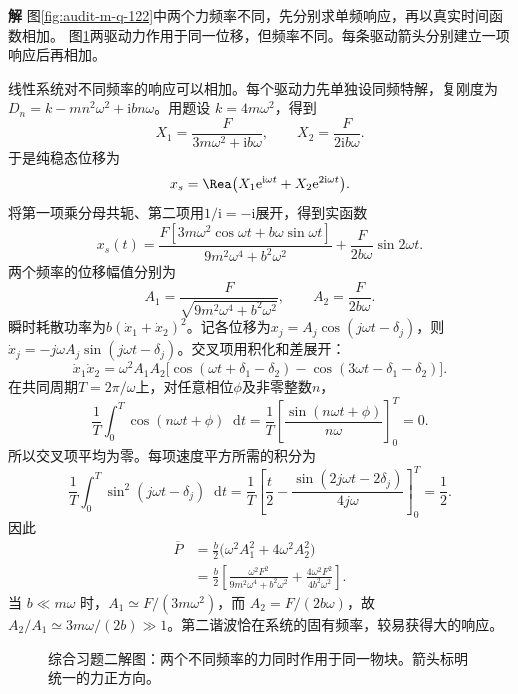 \documentclass[11pt,openany,fontset=fandol]{ctexbook}
\theoremstyle{plain}\newtheorem{theorem}{定理}[chapter]\newtheorem{proposition}[theorem]{命题}
\theoremstyle{definition}\newtheorem{definition}{定义}[chapter]\newtheorem{example}{例}[chapter]
\theoremstyle{remark}\newtheorem*{remark}{说明}
\newcommand{\SolutionStart}{\par\nobreak\medskip\nobreak\noindent\textbf{解}\quad\ignorespaces}
\newenvironment{solution}{\SolutionStart}{\par\medskip}
\newcommand{\dd}{\mathop{}\!\mathrm d}\newcommand{\ii}{\mathrm i}\newcommand{\ee}{\mathrm e}
\begin{document}
\begin{solution}
图\ref{fig:audit-m-q-122}中两个力频率不同，先分别求单频响应，再以真实时间函数相加。
图\ref{fig:ex-5-2}两驱动力作用于同一位移，但频率不同。每条驱动箭头分别建立一项响应后再相加。

线性系统对不同频率的响应可以相加。每个驱动力先单独设同频特解，复刚度为 $D_n=k-mn^2\omega^2+\ii bn\omega$。用题设 $k=4m\omega^2$，得到
\[
X_1=\frac F{3m\omega^2+\ii b\omega},\qquad
X_2=\frac F{2\ii b\omega}.
\]
于是纯稳态位移为
\[
x_s=\Rea\big(X_1\ee^{\ii\omega t}+X_2\ee^{2\ii\omega t}\big).
\]
将第一项乘分母共轭、第二项用$1/\ii=-\ii$展开，得到实函数
\[
x_s(t)=\frac{F[3m\omega^2\cos\omega t+b\omega\sin\omega t]}
{9m^2\omega^4+b^2\omega^2}
+\frac{F}{2b\omega}\sin2\omega t.
\]
两个频率的位移幅值分别为
\[
A_1=\frac F{\sqrt{9m^2\omega^4+b^2\omega^2}},\qquad
A_2=\frac F{2b\omega}.
\]
瞬时耗散功率为$b(\dot x_1+\dot x_2)^2$。记各位移为$x_j=A_j\cos(j\omega t-\delta_j)$，则
$\dot x_j=-j\omega A_j\sin(j\omega t-\delta_j)$。交叉项用积化和差展开：
\[\dot x_1\dot x_2=\omega^2A_1A_2
\bigl[\cos(\omega t+\delta_1-\delta_2)
-\cos(3\omega t-\delta_1-\delta_2)\bigr].\]
在共同周期$T=2\pi/\omega$上，对任意相位$\phi$及非零整数$n$，
\[\frac1T\int_0^T\cos(n\omega t+\phi)\dd t
=\frac1T\left[\frac{\sin(n\omega t+\phi)}{n\omega}\right]_0^T=0.\]
所以交叉项平均为零。每项速度平方所需的积分为
\[\frac1T\int_0^T\sin^2(j\omega t-\delta_j)\dd t
=\frac1T\left[\frac t2-\frac{\sin(2j\omega t-2\delta_j)}{4j\omega}\right]_0^T
=\frac12.\]
因此
\begin{align*}
\overline P&=\frac b2\big(\omega^2A_1^2+4\omega^2A_2^2\big)\\
&=\frac b2\left[
\frac{\omega^2F^2}{9m^2\omega^4+b^2\omega^2}
+\frac{4\omega^2F^2}{4b^2\omega^2}\right].
\end{align*}
当 $b\ll m\omega$ 时，$A_1\simeq F/(3m\omega^2)$，而 $A_2=F/(2b\omega)$，故 $A_2/A_1\simeq3m\omega/(2b)\gg1$。第二谐波恰在系统的固有频率，较易获得大的响应。

\begin{figure}[H]\centering
{}
\caption{综合习题二解图：两个不同频率的力同时作用于同一物块。箭头标明统一的力正方向。}\label{fig:ex-5-2}
\end{figure}


\end{solution}
\end{document}
